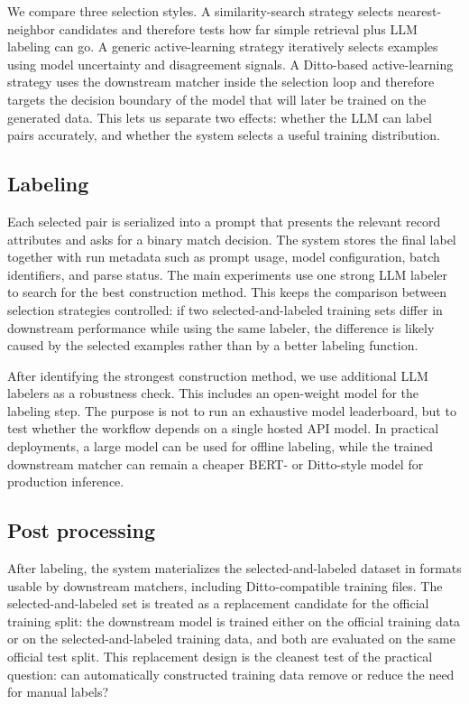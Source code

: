 We compare three selection styles. A similarity-search strategy selects nearest-neighbor candidates and therefore tests how far simple retrieval plus LLM labeling can go. A generic active-learning strategy iteratively selects examples using model uncertainty and disagreement signals. A Ditto-based active-learning strategy uses the downstream matcher inside the selection loop and therefore targets the decision boundary of the model that will later be trained on the generated data. This lets us separate two effects: whether the LLM can label pairs accurately, and whether the system selects a useful training distribution.

\subsection{Labeling}

Each selected pair is serialized into a prompt that presents the relevant record attributes and asks for a binary match decision. The system stores the final label together with run metadata such as prompt usage, model configuration, batch identifiers, and parse status. The main experiments use one strong LLM labeler to search for the best construction method. This keeps the comparison between selection strategies controlled: if two selected-and-labeled training sets differ in downstream performance while using the same labeler, the difference is likely caused by the selected examples rather than by a better labeling function.

After identifying the strongest construction method, we use additional LLM labelers as a robustness check. This includes an open-weight model for the labeling step. The purpose is not to run an exhaustive model leaderboard, but to test whether the workflow depends on a single hosted API model. In practical deployments, a large model can be used for offline labeling, while the trained downstream matcher can remain a cheaper BERT- or Ditto-style model for production inference.

\subsection{Post processing}

After labeling, the system materializes the selected-and-labeled dataset in formats usable by downstream matchers, including Ditto-compatible training files. The selected-and-labeled set is treated as a replacement candidate for the official training split: the downstream model is trained either on the official training data or on the selected-and-labeled training data, and both are evaluated on the same official test split. This replacement design is the cleanest test of the practical question: can automatically constructed training data remove or reduce the need for manual labels?

